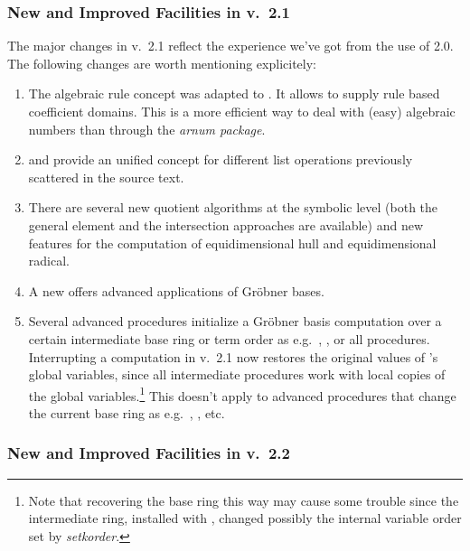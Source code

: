 \subsubsection{New and Improved Facilities in v.~2.1}

The major changes in v.~2.1 reflect the experience we've got from the
use of  2.0. The following changes are worth mentioning
explicitely:
\begin{enumerate}
\item The algebraic rule concept was adapted to . It allows to
supply rule based coefficient domains. This is a more efficient way
to deal with (easy) algebraic numbers than through the \emph{arnum
package}.

\item {} and  provide an unified
concept for different list operations previously scattered in the
source text.

\item There are several new quotient algorithms at the symbolic level
(both the general element and the intersection approaches are
available) and new features for the computation of equidimensional
hull and equidimensional radical.

\item A new  offers advanced applications of Gr\"obner
bases.

\item Several advanced procedures initialize a Gr\"obner basis computation
over a certain intermediate base ring or term order as e.g.\
, ,  or all
 procedures. Interrupting a computation in
v.~2.1 now restores the original values of \package{CALI}'s global variables,
since all intermediate procedures work with local copies of
the global variables.\footnote{Note that recovering the base
ring this way may cause some trouble since the intermediate ring,
installed with \ind{setring}, changed possibly the internal variable
order set by \emph{setkorder}.} This doesn't apply to advanced
procedures that change the current base ring as e.g.\ ,
\ind{preimage}, \ind{sym} etc.

\end{enumerate}

\subsubsection{New and Improved Facilities in v.~2.2}

